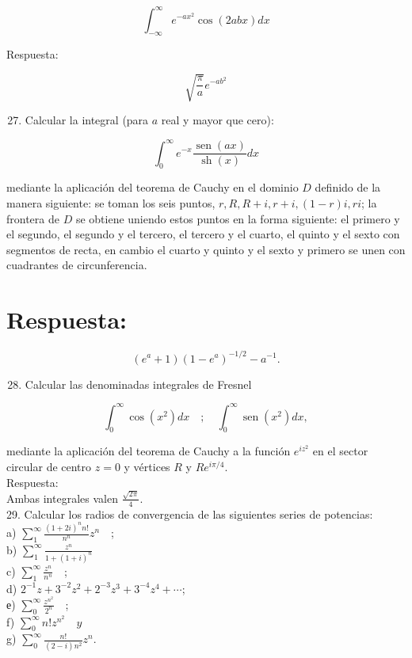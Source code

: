 \documentclass[10pt]{article}
\theoremstyle{plain}
\theoremstyle{definition}
\theoremstyle{remark}
\begin{document}
$$
\int_{-\infty}^{\infty} e^{-a x^{2}} \cos (2 a b x) d x
$$

Respuesta:

$$
\sqrt{\frac{\pi}{a}} e^{-a b^{2}}
$$

\begin{enumerate}
  \setcounter{enumi}{26}
  \item Calcular la integral (para $a$ real y mayor que cero):
\end{enumerate}

$$
\int_{0}^{\infty} e^{-x} \frac{\operatorname{sen}(a x)}{\operatorname{sh}(x)} d x
$$

mediante la aplicación del teorema de Cauchy en el dominio $D$ definido de la manera siguiente: se toman los seis puntos, $r, R, R+i, r+i,(1-r) i, r i$; la frontera de $D$ se obtiene uniendo estos puntos en la forma siguiente: el primero y el segundo, el segundo y el tercero, el tercero y el cuarto, el quinto y el sexto con segmentos de recta, en cambio el cuarto y quinto y el sexto y primero se unen con cuadrantes de circunferencia.

\section*{Respuesta:}
$$
\left(e^{a}+1\right)\left(1-e^{a}\right)^{-1 / 2}-a^{-1} .
$$

\begin{enumerate}
  \setcounter{enumi}{27}
  \item Calcular las denominadas integrales de Fresnel
\end{enumerate}

$$
\int_{0}^{\infty} \cos \left(x^{2}\right) d x \quad ; \quad \int_{0}^{\infty} \operatorname{sen}\left(x^{2}\right) d x,
$$

mediante la aplicación del teorema de Cauchy a la función $e^{i z^{2}}$ en el sector circular de centro $z=0$ y vértices $R$ y $R e^{i \pi / 4}$.\\
Respuesta:\\
Ambas integrales valen $\frac{\sqrt{2 \pi}}{4}$.\\
29. Calcular los radios de convergencia de las siguientes series de potencias:\\
a) $\sum_{1}^{\infty} \frac{(1+2 i)^{n} n!}{n^{n}} z^{n} \quad$;\\
b) $\sum_{1}^{\infty} \frac{z^{n}}{1+(1+i)^{n}}$\\
c) $\sum_{1}^{\infty} \frac{z^{n}}{n^{n}} \quad$;\\
d) $2^{-1} z+3^{-2} z^{2}+2^{-3} z^{3}+3^{-4} z^{4}+\cdots$;\\
е) $\sum_{0}^{\infty} \frac{z^{n^{2}}}{2^{n}} \quad$;\\
f) $\sum_{0}^{\infty} n!z^{n^{2}} \quad y$\\
g) $\sum_{0}^{\infty} \frac{n!}{(2-i) n^{2}} z^{n}$.
\end{document}
